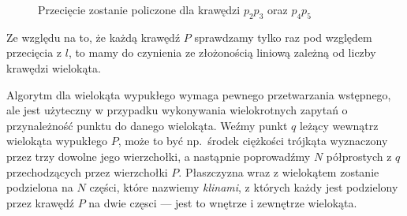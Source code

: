 \begin{itemize}
  \begin{figure}[htp]
    \centering
    \caption{Przecięcie zostanie policzone dla krawędzi $p_{2}p_{3}$
      oraz $p_{4}p_{5}$ }
  \end{figure}

\end{itemize}

Ze względu na to, że każdą krawędź $P$ sprawdzamy tylko raz pod względem
przecięcia z $l$, to mamy do czynienia ze złożonością liniową zależną od
liczby krawędzi wielokąta.

Algorytm dla wielokąta wypukłego wymaga pewnego przetwarzania
wstępnego, ale jest użyteczny w przypadku wykonywania wielokrotnych
zapytań o przynależność punktu do danego wielokąta. Weźmy punkt $q$
leżący wewnątrz wielokąta wypukłego $P$, może to być np.\ środek
ciężkości trójkąta wyznaczony przez trzy dowolne jego wierzchołki, a
nastąpnie poprowadźmy $N$ półprostych z $q$ przechodzących przez
wierzchołki $P$. Płaszczyzna wraz z wielokątem zostanie podzielona na
$N$ części, które nazwiemy \emph{klinami}, z których każdy jest podzielony
przez krawędź $P$ na dwie częsci --- jest to wnętrze i zewnętrze
wielokąta.

\begin{figure}[htp]
  \centering
  \caption{}
\end{figure}

